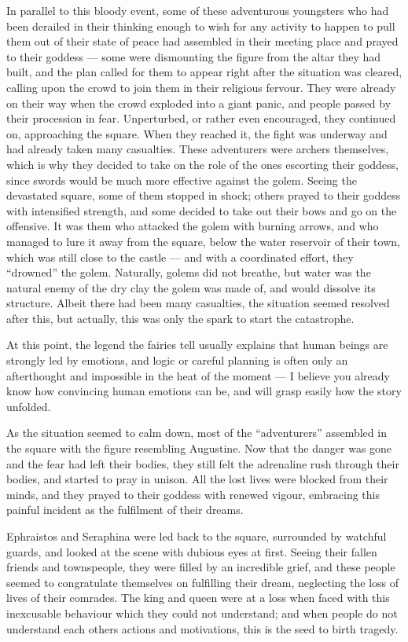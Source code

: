 In parallel to this bloody event, some of these adventurous youngsters who had been derailed in their thinking enough to wish for any activity to happen to pull them out of their state of peace had assembled in their meeting place and prayed to their goddess --- some were dismounting the figure from the altar they had built, and the plan called for them to appear right after the situation was cleared, calling upon the crowd to join them in their religious fervour. They were already on their way when the crowd exploded into a giant panic, and people passed by their procession in fear. Unperturbed, or rather even encouraged, they continued on, approaching the square. When they reached it, the fight was underway and had already taken many casualties. These adventurers were archers themselves, which is why they decided to take on the role of the ones escorting their goddess, since swords would be much more effective against the golem. Seeing the devastated square, some of them stopped in shock; others prayed to their goddess with intensified strength, and some decided to take out their bows and go on the offensive. It was them who attacked the golem with burning arrows, and who managed to lure it away from the square, below the water reservoir of their town, which was still close to the castle --- and with a coordinated effort, they \enquote{drowned} the golem. Naturally, golems did not breathe, but water was the natural enemy of the dry clay the golem was made of, and would dissolve its structure. Albeit there had been many casualties, the situation seemed resolved after this, but actually, this was only the spark to start the catastrophe.

At this point, the legend the fairies tell usually explains that human beings are strongly led by emotions, and logic or careful planning is often only an afterthought and impossible in the heat of the moment --- I believe you already know how convincing human emotions can be, and will grasp easily how the story unfolded.

As the situation seemed to calm down, most of the \enquote{adventurers} assembled in the square with the figure resembling Augustine. Now that the danger was gone and the fear had left their bodies, they still felt the adrenaline rush through their bodies, and started to pray in unison. All the lost lives were blocked from their minds, and they prayed to their goddess with renewed vigour, embracing this painful incident as the fulfilment of their dreams.

Ephraistos and Seraphina were led back to the square, surrounded by watchful guards, and looked at the scene with dubious eyes at first. Seeing their fallen friends and townspeople, they were filled by an incredible grief, and these people seemed to congratulate themselves on fulfilling their dream, neglecting the loss of lives of their comrades. The king and queen were at a loss when faced with this inexcusable behaviour which they could not understand; and when people do not understand each others actions and motivations, this is the seed to birth tragedy.

